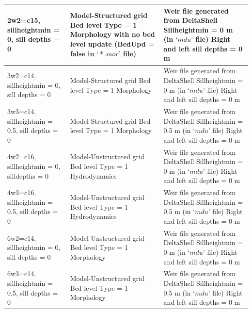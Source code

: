 \begin {table} [H]
\begin{center}
\begin{tabular} { |p{5cm} | p{5cm} |p{5cm} | }
		  \\ 		\hline
		2w2=c15, sillheightmin = 0, sill depths = 0 & Model-Structured grid
		Bed level Type = 1
		Morphology with no bed level update (BedUpd = false in $‘*.mor’$ file)
		 & Weir file generated from DeltaShell
		 Sillheightmin  = 0 m (in $‘mdu’$ file)
		 Right and left sill depths = 0 m
		  \\ 		\hline
		3w2=c14, sillheightmin = 0, sill depths = 0 & Model-Structured grid
		Bed level Type = 1
		Morphology
		 & Weir file generated from DeltaShell
		 Sillheightmin  = 0 m (in $‘mdu’$ file)
		 Right and left sill depths = 0 m
		  \\ 		\hline
		3w3=c14, sillheightmin = 0.5, sill depths = 0 & Model-Structured grid
		Bed level Type = 1
		Morphology
		 & Weir file generated from DeltaShell
		 Sillheightmin  = 0.5 m (in $‘mdu’$ file)
		 Right and left sill depths = 0 m
		  \\ 		\hline
		4w2=c16, sillheightmin = 0, silldepths = 0  & Model-Unstructured grid
		Bed level Type = 1
		Hydrodynamics
		 & Weir file generated from DeltaShell
		 Sillheightmin  = 0 m (in $‘mdu’$ file)
		 Right and left sill depths = 0 m
		  \\ 		\hline
		4w3=c16, sillheightmin = 0.5, sill depths = 0 & Model-Unstructured grid
		Bed level Type = 1
		Hydrodynamics
		 & Weir file generated from DeltaShell
		 Sillheightmin  = 0.5 m (in $‘mdu’$ file)
		 Right and left sill depths = 0 m
		  \\ 		\hline
		6w2=c14, sillheightmin = 0, sill depths = 0 & Model-Unstructured grid
		Bed level Type = 1
		Morphology
		 & Weir file generated from DeltaShell
		 Sillheightmin  = 0 m (in $‘mdu’$ file)
		 Right and left sill depths = 0 m
		  \\ 		\hline
		6w3=c14, sillheightmin = 0.5, sill depths = 0 & Model-Unstructured grid
		Bed level Type = 1
		Morphology
		 & Weir file generated from DeltaShell
		 Sillheightmin  = 0.5 m (in $‘mdu’$ file)
		 Right and left sill depths = 0 m
		  \\ 		\hline
				
		

	\end{tabular}
\end{center}
\end{table}

